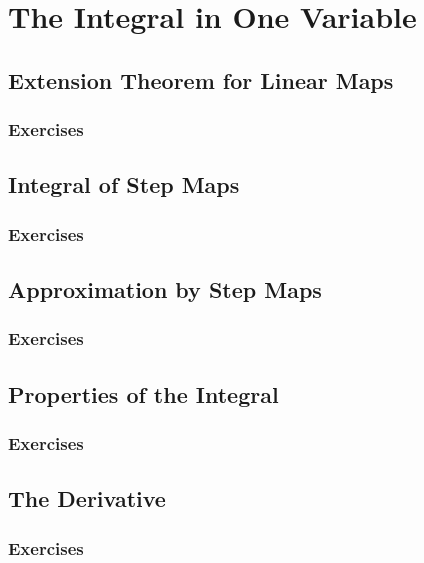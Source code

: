 \setcounter{chapter}{0}
\renewcommand{\thechapter}{10}
\chapter{The Integral in One Variable}\label{ch:10}
\setcounter{equation}{0}	        %

\section{Extension Theorem for Linear Maps}\label{sec:10.1}
\subsection*{Exercises}\label{sec:10.1_Exercises}
\section{Integral of Step Maps}\label{sec:10.2}	
\subsection*{Exercises}\label{sec:10.2_Exercises}
\section{Approximation by Step Maps}\label{sec:10.3}	
\subsection*{Exercises}\label{sec:10.3_Exercises}
\section{Properties of the Integral}\label{sec:10.4}	
\subsection*{Exercises}\label{sec:10.4_Exercises}
\section{The Derivative}\label{sec:10.5}	
\subsection*{Exercises}\label{sec:10.5_Exercises}
